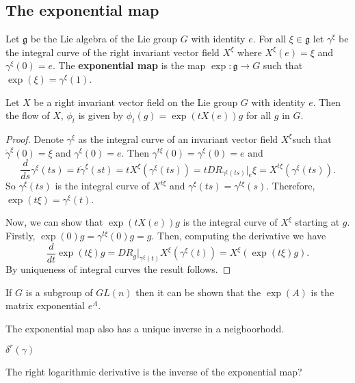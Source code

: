 \subsection{The exponential map}

\begin{definition}
  Let  \(\mathfrak{g}\) be the Lie algebra of the Lie group  \(G\) with identity  \(e\). For all  \(\xi \in \mathfrak{g}\) let  \(\gamma^{\xi}\) be the integral curve of the right invariant vector field  \(X^{\xi}\) where  \(X^\xi (e)=\xi\) and  \(\gamma^\xi(0) = e\). The \textbf{exponential map} is the map  \(\exp : \mathfrak{g} \rightarrow G\) such that  \(\exp(\xi) = \gamma^\xi(1)\).
\end{definition}
\begin{proposition}
  Let  \(X\) be a right invariant vector field on the Lie group  \(G\) with identity  \(e\). Then the flow of  \(X\),  \(\phi_t\) is given by  \(\phi_t(g) = \exp(tX(e))g\) for all  \(g\) in  \(G\).
\end{proposition}
\begin{proof}
  Denote  \(\gamma^{\xi}\) as the integral curve of an  invariant vector field  \(X^{\xi}\)such that  \(\dot{\gamma}^{\xi}(0) = \xi\) and  \(\gamma^\xi(0)=e\). Then  \(\gamma^{t\xi}(0) =  \gamma^{\xi}(0)=e\) and
  \begin{equation}
    \frac{d}{ds}\gamma^{\xi}(ts) = t\dot\gamma^{\xi}(st)=tX^\xi(\gamma^{\xi}(ts)) = t D R_{\gamma^\xi(ts)} \vert_{e} \xi = X^{t\xi}(\gamma^{\xi}(ts)).
  \end{equation}
  So  \(\gamma^\xi(ts)\) is the integral curve of  \(X^{t\xi}\) and  \(\gamma^\xi(ts)=\gamma^{t\xi}(s)\). Therefore,   \(\exp(t\xi) = \gamma^{\xi}(t)\).

  Now, we can show that  \(\exp(tX(e))g\) is the integral curve of  \(X^{\xi}\) starting at  \(g\). Firstly,  \(\exp(0)g = \gamma^{t\xi}(0)g=g\). Then, computing the derivative we have
  \begin{equation}
    \frac{d}{dt} \exp(t\xi)g = D R_g \vert_{\gamma^\xi(t)} X^\xi(\gamma^\xi(t)) = X^\xi(\exp(t\xi)g).
  \end{equation}
  By uniqueness of integral curves the result follows.
\end{proof}
\begin{remark}
  If  \(G\) is a subgroup of  \(GL(n)\) then it can be shown that the  \(\exp(A)\) is the matrix exponential  \(e^{A}\).
\end{remark}


The exponential map also has a unique inverse in a neigboorhodd.
\begin{definition}
  \(\delta^r(\gamma)\)
\end{definition}
\begin{proposition}
  The right logarithmic derivative is the inverse of the exponential map?
\end{proposition}